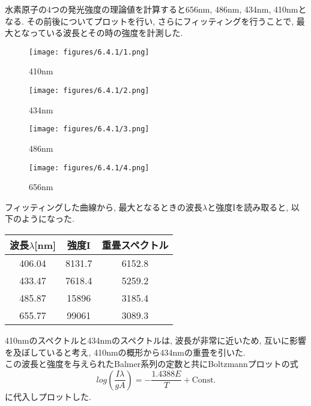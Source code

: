 \documentclass{ltjsarticle}
\begin{document}
水素原子の4つの発光強度の理論値を計算すると656nm, 486nm, 434nm, 410nmとなる. その前後についてプロットを行い, さらにフィッティングを行うことで, 最大となっている波長とその時の強度を計測した. 

\begin{figure}[H]
    \centering
    \begin{minipage}[b]{0.48\textwidth}
      \texttt{[image: figures/6.4.1/1.png]}
      \caption{410nm}
    \end{minipage}
    \hfill
    \begin{minipage}[b]{0.48\textwidth}
      \texttt{[image: figures/6.4.1/2.png]}
      \caption{434nm}
    \end{minipage}
\end{figure}

\begin{figure}[H]
    \centering
    \begin{minipage}[b]{0.48\textwidth}
      \texttt{[image: figures/6.4.1/3.png]}
      \caption{486nm}
    \end{minipage}
    \hfill
    \begin{minipage}[b]{0.48\textwidth}
      \texttt{[image: figures/6.4.1/4.png]}
      \caption{656nm}
    \end{minipage}
\end{figure}

フィッティングした曲線から, 最大となるときの波長$\lambda$と強度Iを読み取ると, 以下のようになった. 

\begin{table}[H]
    \begin{center}
        \begin{tabular}{|c|c|c|} \hline
            波長$\lambda$[nm] & 強度I & 重畳スペクトル \\ \hline
            406.04 & 8131.7 & 6152.8 \\ \hline
            433.47 & 7618.4 & 5259.2 \\ \hline
            485.87 & 15896 & 3185.4 \\ \hline
            655.77 & 99061 & 3089.3 \\ \hline
        \end{tabular}
    \end{center}
\end{table}

410nmのスペクトルと434nmのスペクトルは, 波長が非常に近いため, 互いに影響を及ぼしていると考え, 410nmの概形から434nmの重畳を引いた. \\
この波長と強度を与えられたBalmer系列の定数と共にBoltzmannプロットの式
\[
    log\left(\frac{I\lambda}{gA}\right) = - \frac{1.4388E}{T} + \mbox{Const.}
\]
に代入しプロットした. 
\end{document}
